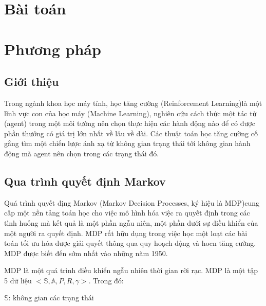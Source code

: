 \documentclass[13pt]{extreport}
\begin{document}
\tableofcontents
\newpage


\newpage
{}
\chapter*{Bài toán}
\chapter*{Phương pháp}
\section{Giới thiệu}
Trong ngành khoa học máy tính, học tăng cường (Reinforcement Learning)là một lĩnh vực con của học máy (Machine Learning), nghiên cứu cách thức một tác tử (agent) trong một môi tường nên chọn thực hiện các hành động nào để có được phần thưởng có giá trị lớn nhất về lâu về dài. Các thuật toán học tăng cường cố gắng tìm một chiến lược ánh xạ từ không gian trạng thái tới không gian hành động mà agent nên chọn trong các trạng thái đó.
\section{Qua trình quyết định Markov}
Quá trình quyết địng Markov (Markov Decision Processes, ký hiệu là MDP)cung cấp một nền tảng toán học cho việc mô hình hóa việc ra quyết định trong các tình huống mà kết quả là một phần ngẫu niên, một phần dưới sự điều khiển của một người ra quyết định. MDP rất hữu dụng trong việc học một loạt các bài toán tối ưu hóa được giải quyết thông qua quy hoạch động và hocn tăng cường. MDP được biết đến sớm nhất vào những năm 1950. 

MDP là một quá trình điều khiển ngẫu nhiên thời gian rời rạc. MDP là một tập 5 dữ liệu $<\mathbb{S},\mathbb{A},P,R,\gamma>$. Trong đó:

 $\mathbb{S}$: không gian các trạng thái
\end{document}

